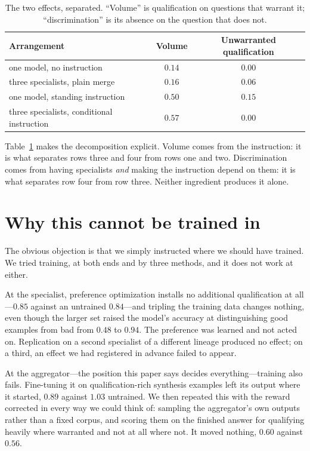\documentclass[11pt]{article}
\begin{document}
\begin{table}[t]
\centering
\caption{The two effects, separated. ``Volume'' is qualification on questions
that warrant it; ``discrimination'' is its absence on the question that does
not.}
\label{tab:sep}
\begin{tabular}{lcc}
\toprule
Arrangement & Volume & Unwarranted qualification \\
\midrule
one model, no instruction & $0.14$ & $0.00$ \\
three specialists, plain merge & $0.16$ & $0.06$ \\
one model, standing instruction & $0.50$ & $0.15$ \\
three specialists, conditional instruction & $0.57$ & $\mathbf{0.00}$ \\
\bottomrule
\end{tabular}
\end{table}

Table~\ref{tab:sep} makes the decomposition explicit. Volume comes from the
instruction: it is what separates rows three and four from rows one and two.
Discrimination comes from having specialists \emph{and} making the instruction
depend on them: it is what separates row four from row three. Neither
ingredient produces it alone.

\section{Why this cannot be trained in}
The obvious objection is that we simply instructed where we should have
trained. We tried training, at both ends and by three methods, and it does not
work at either.

At the specialist, preference optimization installs no additional
qualification at all---$0.85$ against an untrained $0.84$---and tripling the
training data changes nothing, even though the larger set raised the model's
accuracy at distinguishing good examples from bad from $0.48$ to $0.94$. The
preference was learned and not acted on. Replication on a second specialist of
a different lineage produced no effect; on a third, an effect we had
registered in advance failed to appear.

At the aggregator---the position this paper says decides everything---training
also fails. Fine-tuning it on qualification-rich synthesis examples left its
output where it started, $0.89$ against $1.03$ untrained. We then repeated
this with the reward corrected in every way we could think of: sampling the
aggregator's own outputs rather than a fixed corpus, and scoring them on the
finished answer for qualifying heavily where warranted and not at all where
not. It moved nothing, $0.60$ against $0.56$.
\end{document}
